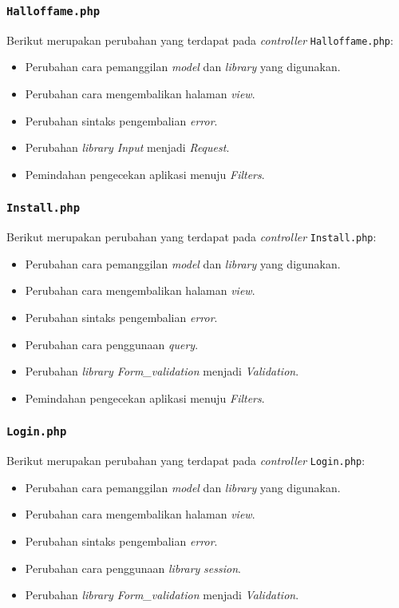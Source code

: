 \subsubsection{\texttt{Halloffame.php}}
Berikut merupakan perubahan yang terdapat pada \textit{controller} \texttt{Halloffame.php}:
\begin{itemize}
	\item Perubahan cara pemanggilan \textit{model} dan \textit{library} yang digunakan.
	\item Perubahan cara mengembalikan halaman \textit{view}.
	\item Perubahan sintaks pengembalian \textit{error}.
	\item Perubahan \textit{library Input} menjadi \textit{Request}.
	\item Pemindahan pengecekan aplikasi menuju \textit{Filters}.
\end{itemize}
\subsubsection{\texttt{Install.php}}
Berikut merupakan perubahan yang terdapat pada \textit{controller} \texttt{Install.php}:
\begin{itemize}
	\item Perubahan cara pemanggilan \textit{model} dan \textit{library} yang digunakan.
	\item Perubahan cara mengembalikan halaman \textit{view}.
	\item Perubahan sintaks pengembalian \textit{error}.
	\item Perubahan cara penggunaan \textit{query}.
	\item Perubahan \textit{library Form\_validation} menjadi \textit{Validation}.
	\item Pemindahan pengecekan aplikasi menuju \textit{Filters}.
\end{itemize}
\subsubsection{\texttt{Login.php}}
Berikut merupakan perubahan yang terdapat pada \textit{controller} \texttt{Login.php}:
\begin{itemize}
	\item Perubahan cara pemanggilan \textit{model} dan \textit{library} yang digunakan.
	\item Perubahan cara mengembalikan halaman \textit{view}.
	\item Perubahan sintaks pengembalian \textit{error}.
	\item Perubahan cara penggunaan \textit{library} \textit{session}.
	\item Perubahan \textit{library Form\_validation} menjadi \textit{Validation}.
\end{itemize}
